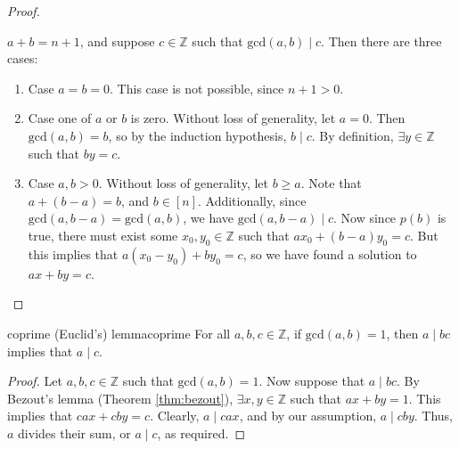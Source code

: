 \documentclass{article}
\theoremstyle{definition}
\def\gcd{\textrm{gcd}}
\def\divides{\mid}
\begin{document}
\begin{proof}
\begin{itemize}
\begin{itemize}
        $a+b = n+1$, and suppose $c \in \mathbb{Z}$ such that
        $\gcd(a,b) \divides c$. Then there are three cases:
        \begin{enumerate}
          \item Case $a=b=0$. This case is not possible, since $n+1 > 0$.
          \item Case one of $a$ or $b$ is zero. Without loss of generality, let
            $a=0$. Then $\gcd(a,b)=b$, so by the induction hypothesis,
            $b \divides c$. By definition, $\exists y \in \mathbb{Z}$ such that
            $by = c$.
          \item Case $a,b > 0$. Without loss of generality, let $b \ge a$. Note
            that $a + (b-a) = b$, and $b \in [n]$. Additionally, since
            $\gcd(a,b-a)=\gcd(a,b)$, we have $\gcd(a,b-a) \divides c$. Now since
            $p(b)$ is true, there must exist some $x_0,y_0 \in \mathbb{Z}$ such
            that $ax_0+(b-a)y_0 = c$. But this implies that
            $a(x_0-y_0) + by_0 = c$, so we have found a solution to $ax+by=c$.
        \end{enumerate}
    \end{itemize}
  \end{itemize}
\end{proof}

\begin{theorem}{coprime (Euclid's) lemma}{coprime}
  For all $a,b,c \in \mathbb{Z}$, if $\gcd(a,b)=1$, then $a \divides bc$
  implies that $a \divides c$.
\end{theorem}
\begin{proof}
  Let $a,b,c \in \mathbb{Z}$ such that $\gcd(a,b)=1$. Now suppose that
  $a \divides bc$. By Bezout's lemma (Theorem \ref{thm:bezout}),
  $\exists x,y \in \mathbb{Z}$ such that $ax+by=1$. This implies that
  $cax+cby=c$. Clearly, $a \divides cax$, and by our assumption,
  $a \divides cby$. Thus, $a$ divides their sum, or $a \divides c$, as required.
\end{proof}
\end{document}

